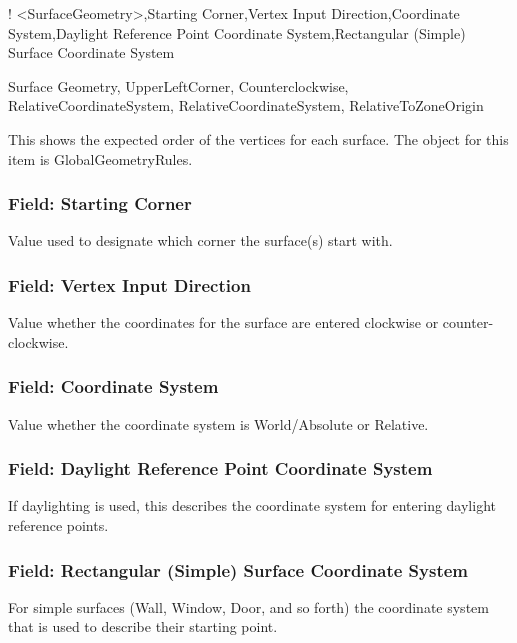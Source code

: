 ! \textless{}SurfaceGeometry\textgreater{},Starting Corner,Vertex Input Direction,Coordinate System,Daylight Reference Point Coordinate System,Rectangular (Simple) Surface Coordinate System

Surface Geometry, UpperLeftCorner, Counterclockwise, RelativeCoordinateSystem, RelativeCoordinateSystem, RelativeToZoneOrigin

This shows the expected order of the vertices for each surface. The object for this item is GlobalGeometryRules.

\subsubsection{Field: Starting Corner}\label{field-starting-corner}

Value used to designate which corner the surface(s) start with.

\subsubsection{Field: Vertex Input Direction}\label{field-vertex-input-direction}

Value whether the coordinates for the surface are entered clockwise or counter-clockwise.

\subsubsection{Field: Coordinate System}\label{field-coordinate-system}

Value whether the coordinate system is World/Absolute or Relative.

\subsubsection{Field: Daylight Reference Point Coordinate System}\label{field-daylight-reference-point-coordinate-system}

If daylighting is used, this describes the coordinate system for entering daylight reference points.

\subsubsection{Field: Rectangular (Simple) Surface Coordinate System}\label{field-rectangular-simple-surface-coordinate-system}

For simple surfaces (Wall, Window, Door, and so forth) the coordinate system that is used to describe their starting point.

